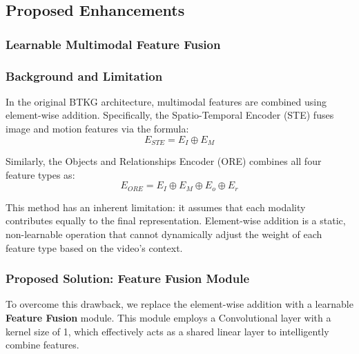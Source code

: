 \subsection{Proposed Enhancements}

\subsubsection{Learnable Multimodal Feature Fusion}

\subsubsection*{Background and Limitation}

In the original BTKG architecture, multimodal features are combined using element-wise addition. Specifically, the Spatio-Temporal Encoder (STE) fuses image and motion features via the formula:
$$E_{STE} = E_I \oplus E_M$$

Similarly, the Objects and Relationships Encoder (ORE) combines all four feature types as:
$$E_{ORE} = E_I \oplus E_M \oplus E_o \oplus E_r$$

This method has an inherent limitation: it assumes that each modality contributes equally to the final representation. Element-wise addition is a static, non-learnable operation that cannot dynamically adjust the weight of each feature type based on the video's context.

\subsubsection*{Proposed Solution: Feature Fusion Module}

To overcome this drawback, we replace the element-wise addition with a learnable \textbf{Feature Fusion} module. This module employs a Convolutional layer with a kernel size of 1, which effectively acts as a shared linear layer to intelligently combine features.

